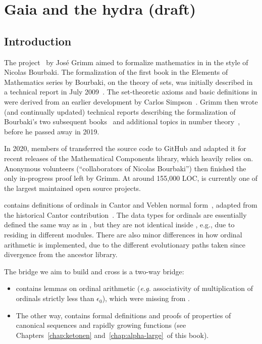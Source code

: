 \chapter{Gaia and the hydra (draft)}
\label{gaia-chapter}

\section{Introduction}
The \gaia project~\cite{Gaia} by Jos\'e Grimm aimed to formalize mathematics in \coq  in
the style of Nicolas Bourbaki. The formalization of the first book in the
Elements of Mathematics series by Bourbaki, on the theory of sets, was
initially described in a technical report in July 2009~\cite{Grimm2009a}.
The set-theoretic axioms and basic definitions in \gaia were derived
from an earlier development by Carlos Simpson~\cite{Simpson2004,CatsZFCContrib}.
Grimm then wrote (and continually updated) technical reports describing the
formalization of Bourbaki's two subsequent books~\cite{Grimm2009b,Grimm2016}
and additional topics in number theory~\cite{grimm:hal-00911710,Grimm2014},
before he passed away in 2019.

In 2020, members of \community transferred the \gaia source code to
GitHub and adapted it for recent releases of the Mathematical Components
library, which \gaia heavily relies on.
Anonymous volunteers (``collaborators of Nicolas Bourbaki'') then finished
the only in-progress proof left by Grimm. At around 155,000 LOC, \gaia is currently one of the largest maintained open source \coq projects.

\gaia contains definitions of ordinals in Cantor and Veblen normal form~\cite{grimm:hal-00911710}, adapted from the historical Cantor contribution~\cite{CantorContrib}. The data types for ordinals are essentially defined the same way as in \Hydras, but they are not identical inside \coq, e.g., due to residing in different modules. There are also minor differences in how ordinal arithmetic is implemented, due to the different evolutionary paths taken since divergence from the ancestor library.



The bridge we aim to build and cross is a two-way bridge:

\begin{itemize}
\item \gaia contains lemmas on ordinal arithmetic (\emph{e.g.} associativity of multiplication of ordinals strictly less than $\epsilon_0$), which were missing from \Hydras. 
  \item The other way, \Hydras contains formal definitions and proofs of properties of canonical sequences and rapidly growing functions  (see Chapters~\ref{chap:ketonen} and~\ref{chap:alpha-large}~of this book).
  \end{itemize}
  
